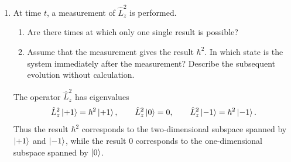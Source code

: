 \documentclass[11pt,a4paper]{scrartcl}
\newcommand{\op}[1]{\hat{#1}}
\begin{document}
\begin{enumerate}[label=(\alph*)]
        \begin{answerbox}
            \[
                \boxed{\langle\op{L}_x(t)\rangle=0,
                \qquad
                \langle\op{L}_y(t)\rangle=-\hbar\sin(2\omega_0t),
                \qquad
                \langle\op{L}_z(t)\rangle=0.}
            \]
            Therefore
            \[
                \boxed{\langle\op{\mathbf{L}}(t)\rangle=(0,-\hbar\sin(2\omega_0t),0).}
            \]
            The expectation value vector oscillates on the $y$-axis between $-\hbar\mathbf{e}_y$ and $+\hbar\mathbf{e}_y$ with angular frequency $2\omega_0$.

            \begin{center}
            \end{center}
        \end{answerbox}

        \item At time $t$, a measurement of $\op{L}_z^2$ is performed.
        \begin{enumerate}[label=(\roman*)]
            \item Are there times at which only one single result is possible?
            \item Assume that the measurement gives the result $\hbar^2$. In which state is the system immediately after the measurement? Describe the subsequent evolution without calculation.
        \end{enumerate}

        \begin{calculationbox}
            The operator $\op{L}_z^2$ has eigenvalues
            \[
                \op{L}_z^2\ket{+1}=\hbar^2\ket{+1},
                \qquad
                \op{L}_z^2\ket{0}=0,
                \qquad
                \op{L}_z^2\ket{-1}=\hbar^2\ket{-1}.
            \]
            Thus the result $\hbar^2$ corresponds to the two-dimensional subspace spanned by $\ket{+1}$ and $\ket{-1}$, while the result $0$ corresponds to the one-dimensional subspace spanned by $\ket{0}$.


\end{calculationbox}
\end{enumerate}
\end{document}
